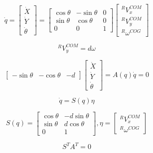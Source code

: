 \begin{equation}
\label{eq:allapot}
\dot{q} = 
\begin{bmatrix}
\dot{X}\\ 
\dot{Y}\\
\dot{\theta}
\end{bmatrix}= \begin{bmatrix}
\cos \theta  & -\sin \theta & 0 \\
\sin\theta & \cos \theta &  0\\ 
 0 & 0  & 1
\end{bmatrix}
\begin{bmatrix}
^RV^{COM}_x\\ 
^RV^{COM}_y\\ 
^R\omega^{COG}
\end{bmatrix}
\end{equation}

\begin{equation}
\label{eq:SebComY}
^RV^{COM}_y = d\omega
\end{equation}

\begin{equation}
\label{eq:nemholomonikusmegkotes}
\begin{bmatrix}
-\sin\theta  & -\cos\theta  & -d
\end{bmatrix}
\begin{bmatrix}
\dot{X}\\ 
\dot{Y}\\
\dot{\theta}
\end{bmatrix} = A(q) \dot{q} =0
\end{equation}

\begin{equation}
    \label{eq:allapotegyszeru}
    \dot q = S(q)\eta 
\end{equation}

\begin{equation*}
S(q)=\begin{bmatrix}
\cos \theta  & -d\sin \theta  \\
\sin\theta & d\cos \theta \\ 
 0  & 1
\end{bmatrix},
\eta=\begin{bmatrix}
^RV^{COM}_x\\ 
^R\omega^{COG}
\end{bmatrix}
\end{equation*}

\begin{equation}
\label{eq:SxAeqZero}
    S^TA^T=0
\end{equation}



